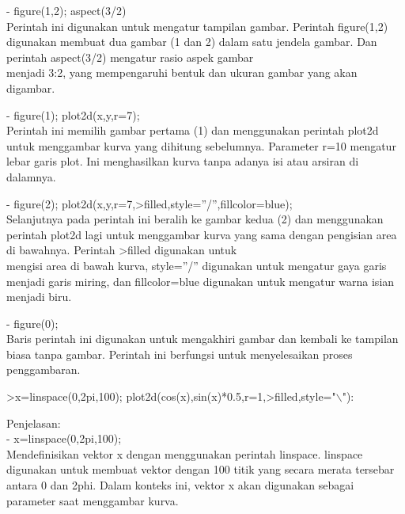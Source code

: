 \documentclass{article}
\begin{document}
\begin{eulernotebook}
\begin{eulercomment}
- figure(1,2); aspect(3/2)\\
Perintah ini digunakan untuk mengatur tampilan gambar. Perintah
figure(1,2) digunakan membuat dua gambar (1 dan 2) dalam satu jendela
gambar. Dan perintah aspect(3/2) mengatur rasio aspek gambar\\
menjadi 3:2, yang mempengaruhi bentuk dan ukuran gambar yang akan
digambar.

- figure(1); plot2d(x,y,r=7);\\
Perintah ini memilih gambar pertama (1) dan menggunakan perintah
plot2d untuk menggambar kurva yang dihitung sebelumnya. Parameter r=10
mengatur lebar garis plot. Ini menghasilkan kurva tanpa adanya isi
atau arsiran di dalamnya.

- figure(2); plot2d(x,y,r=7,\textgreater{}filled,style=”/”,fillcolor=blue);\\
Selanjutnya pada perintah ini beralih ke gambar kedua (2) dan
menggunakan perintah plot2d lagi untuk menggambar kurva yang sama
dengan pengisian area di bawahnya. Perintah \textgreater{}filled digunakan untuk\\
mengisi area di bawah kurva, style=”/” digunakan untuk mengatur gaya
garis menjadi garis miring, dan fillcolor=blue digunakan untuk
mengatur warna isian menjadi biru.

- figure(0);\\
Baris perintah ini digunakan untuk mengakhiri gambar dan kembali ke
tampilan biasa tanpa gambar. Perintah ini berfungsi untuk
menyelesaikan proses penggambaran.
\end{eulercomment}
\begin{eulerprompt}
>x=linspace(0,2pi,100); plot2d(cos(x),sin(x)*0.5,r=1,>filled,style="\(\backslash\)"):
\end{eulerprompt}
\begin{eulercomment}
Penjelasan:\\
- x=linspace(0,2pi,100);\\
Mendefinisikan vektor x dengan menggunakan perintah linspace. linspace
digunakan untuk membuat vektor dengan 100 titik yang secara merata
tersebar antara 0 dan 2phi. Dalam konteks ini, vektor x akan digunakan
sebagai parameter saat menggambar kurva.


\end{eulercomment}
\end{eulernotebook}
\end{document}
